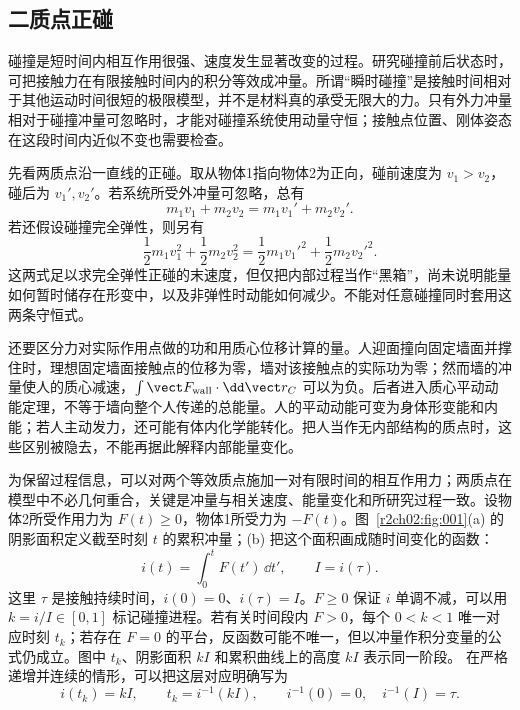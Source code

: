 \subsection{二质点正碰}
\label{r2ch02:sec:point-collision}

碰撞是短时间内相互作用很强、速度发生显著改变的过程。研究碰撞前后状态时，可把接触力在有限接触时间内的积分等效成冲量。所谓“瞬时碰撞”是接触时间相对于其他运动时间很短的极限模型，并不是材料真的承受无限大的力。只有外力冲量相对于碰撞冲量可忽略时，才能对碰撞系统使用动量守恒；接触点位置、刚体姿态在这段时间内近似不变也需要检查。

先看两质点沿一直线的正碰。取从物体1指向物体2为正向，碰前速度为 $v_1>v_2$，碰后为 $v_1',v_2'$。若系统所受外冲量可忽略，总有
\[
 m_1v_1+m_2v_2=m_1v_1'+m_2v_2'.
\]
若还假设碰撞完全弹性，则另有
\[
 \frac12m_1v_1^2+\frac12m_2v_2^2
 =\frac12m_1v_1'^2+\frac12m_2v_2'^2.
\]
这两式足以求完全弹性正碰的末速度，但仅把内部过程当作“黑箱”，尚未说明能量如何暂时储存在形变中，以及非弹性时动能如何减少。不能对任意碰撞同时套用这两条守恒式。

还要区分力对实际作用点做的功和用质心位移计算的量。人迎面撞向固定墙面并撑住时，理想固定墙面接触点的位移为零，墙对该接触点的实际功为零；然而墙的冲量使人的质心减速，$\int\vect F_{\rm wall}\cdot\dd\vect r_C$ 可以为负。后者进入质心平动动能定理，不等于墙向整个人传递的总能量。人的平动动能可变为身体形变能和内能；若人主动发力，还可能有体内化学能转化。把人当作无内部结构的质点时，这些区别被隐去，不能再据此解释内部能量变化。

为保留过程信息，可以对两个等效质点施加一对有限时间的相互作用力；两质点在模型中不必几何重合，关键是冲量与相关速度、能量变化和所研究过程一致。设物体2所受作用力为 $F(t)\geqslant0$，物体1所受力为 $-F(t)$。图~\ref{r2ch02:fig:001}(a) 的阴影面积定义截至时刻 $t$ 的累积冲量；(b) 把这个面积画成随时间变化的函数：
\begin{equation}
 i(t)=\int_0^tF(t')\,\dd t',\qquad I=i(\tau).
 \label{r2ch02:eq:025}
\end{equation}
这里 $\tau$ 是接触持续时间，$i(0)=0$、$i(\tau)=I$。$F\geqslant0$ 保证 $i$ 单调不减，可以用 $k=i/I\in[0,1]$ 标记碰撞进程。若有关时间段内 $F>0$，每个 $0<k<1$ 唯一对应时刻 $t_k$；若存在 $F=0$ 的平台，反函数可能不唯一，但以冲量作积分变量的公式仍成立。图中 $t_k$、阴影面积 $kI$ 和累积曲线上的高度 $kI$ 表示同一阶段。
在严格递增并连续的情形，可以把这层对应明确写为
\[
 i(t_k)=kI,\qquad t_k=i^{-1}(kI),\qquad i^{-1}(0)=0,\quad i^{-1}(I)=\tau.
\]
\figImpulseHistory

